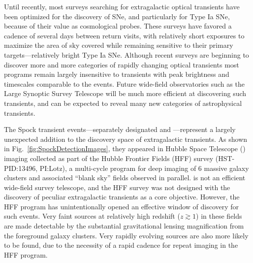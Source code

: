 


Until recently, most surveys searching for extragalactic optical
transients have been optimized for the discovery of SNe, and
particularly for Type Ia SNe, because of their value as cosmological
probes\cite{Weinberg:2013}.  These surveys have favored a cadence of
several days between return visits, with relatively short exposures to
maximize the area of sky covered while remaining sensitive to their
primary targets---relatively bright Type Ia SNe.  Although recent
surveys are beginning to discover more and more categories of rapidly
changing optical transients\cite{Kasliwal:2011a,Drout:2014} most
programs remain largely insensitive to transients with peak brightness
and timescales comparable to the \spock events\cite{Berger:2013b}.
Future wide-field observatories such as the Large Synoptic Survey
Telescope\cite{Tyson:2002} will be much more efficient at discovering
such transients, and can be expected to reveal many new categories of
astrophysical transients.

The Spock transient events---separately designated \spockone and
\spocktwo---represent a largely unexpected addition to the discovery
space of extragalactic transients.  As shown in
Fig.~\ref{fig:SpockDetectionImages}, they appeared in Hubble Space
Telescope (\HST) imaging collected as part of the Hubble Frontier
Fields (HFF) survey (HST-PID:13496, PI:Lotz), a multi-cycle program
for deep imaging of 6 massive galaxy clusters and associated ``blank
sky'' fields observed in parallel.  \HST is not an efficient
wide-field survey telescope, and the HFF survey was not designed with
the discovery of peculiar extragalactic transients as a core
objective.  However, the HFF program has unintentionally opened an
effective window of discovery for such events.  Very faint sources at
relatively high redshift ($z\gtrsim1$) in these fields are made
detectable by the substantial gravitational lensing magnification from
the foreground galaxy clusters.  Very rapidly evolving sources are
also more likely to be found, due to the necessity of a rapid cadence
for repeat imaging in the HFF program.

